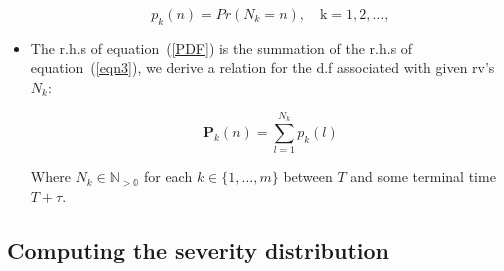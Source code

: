 \documentclass{DissertateUSU}
\begin{document}
\begin{itemize}
\singlespacing
\begin{equation}\label{FrequencyDensityFcn}
p_k(n)=Pr\left(N_{k} = n\right), \quad \mbox{k} = 1, 2,\ldots, 
\end{equation} 
\doublespacing

\item The r.h.s of equation~(\ref{PDF}) is the summation of the r.h.s of equation~(\ref{eqn3}), we derive a relation for the d.f associated with given rv's $N_k$: 

\singlespacing
\begin{equation}\label{FrequencyDistributionFcn} 
\mathbf{P}_{k}(n)=\sum_{l=1}^{N_k} p_{k}(l) 
\end{equation}
\doublespacing

Where $N_k \in \mathbb{N_{>0}}$ for each $k \in \{1,\ldots,m\}$ between $T$ and some terminal time $T+\tau$.

\end{itemize}

\subsection{Computing the severity distribution}
\end{document}
